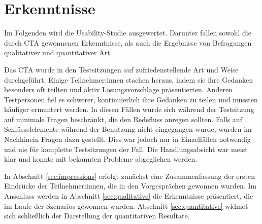 \section{Erkenntnisse}
\label{sec:results}

Im Folgenden wird die Usability-Studie ausgewertet. Darunter fallen sowohl die durch \acs{CTA} gewonnenen Erkenntnisse, als auch die Ergebnisse von Befragungen qualitativer und quantitativer Art.

Das \ac{CTA} wurde in den Testsitzungen auf zufriedenstellende Art und Weise durchgeführt. Einige Teilnehmer:innen stachen heraus, indem sie ihre Gedanken besonders oft teilten und aktiv Lösungsvorschläge präsentierten. Anderen Testpersonen fiel es schwerer, kontinuierlich ihre Gedanken zu teilen und mussten häufiger ermuntert werden. In diesen Fällen wurde sich während der Testsitzung auf minimale Fragen beschränkt, die den Redefluss anregen sollten. Falls auf Schlüsselelemente während der Benutzung nicht eingegangen wurde, wurden im Nachhinein Fragen dazu gestellt. Dies war jedoch nur in Einzelfällen notwendig und nie für komplette Testsitzungen der Fall. Die Handlungsabsicht war meist klar und konnte mit bekannten Probleme abgeglichen werden.

In Abschnitt \ref{sec:impressions} erfolgt zunächst eine Zusammenfassung der ersten Eindrücke der Teilnehmer:innen, die in den Vorgesprächen gewonnen wurden. Im Anschluss werden in Abschnitt \ref{sec:qualitative} die Erkenntnisse präsentiert, die im Laufe der Szenarios gewonnen wurden. Abschnitt \ref{sec:quantitative} widmet sich schließlich der Darstellung der quantitativen Resultate.
